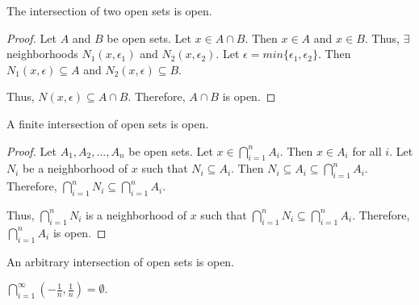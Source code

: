 \begin{theorem}{}{}
    The intersection of two open sets is open.
\end{theorem}
\begin{proof}
    Let $A$ and $B$ be open sets. Let $x \in A \cap B$. Then $x \in A$ and $x \in B$. Thus, $\exists$ neighborhoods $N_1(x, \epsilon_1)$ and $N_2(x, \epsilon_2)$. Let $\epsilon = min\{\epsilon_1, \epsilon_2\}$. Then $N_1(x, \epsilon) \subseteq A$ and $N_2(x, \epsilon) \subseteq B$. 
    
    Thus, $N(x, \epsilon) \subseteq A \cap B$. Therefore, $A \cap B$ is open.
\end{proof}

\begin{theorem}{}{}
    A finite intersection of open sets is open.
\end{theorem}
\begin{proof}
    Let $A_1, A_2, \ldots, A_n$ be open sets. Let $x \in \bigcap_{i=1}^n A_i$. Then $x \in A_i$ for all $i$. Let $N_i$ be a neighborhood of $x$ such that $N_i \subseteq A_i$. Then $N_i \subseteq A_i \subseteq \bigcap_{i=1}^n A_i$. Therefore, $\bigcap_{i=1}^n N_i \subseteq \bigcap_{i=1}^n A_i$. 
    
    Thus, $\bigcap_{i=1}^n N_i$ is a neighborhood of $x$ such that $\bigcap_{i=1}^n N_i \subseteq \bigcap_{i=1}^n A_i$. Therefore, $\bigcap_{i=1}^n A_i$ is open.
\end{proof}

\begin{theorem}{}{}
    An arbitrary intersection of open sets is open.
\end{theorem}
\begin{note}
    $\bigcap_{i=1}^\infty (-\frac{1}{n}, \frac{1}{n}) = \emptyset$.
\end{note}
